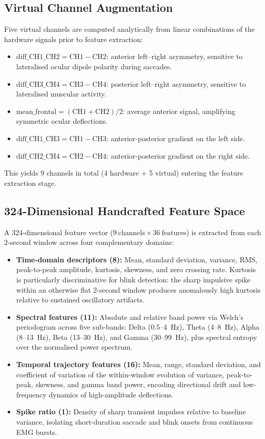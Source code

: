 \documentclass[11pt,a4paper]{article}
\begin{document}
\subsection{Virtual Channel Augmentation}
Five virtual channels are computed analytically from linear combinations of the hardware signals prior to feature extraction:
\begin{itemize}
    \item $\text{diff\_CH1\_CH2} = \text{CH1} - \text{CH2}$: anterior left--right asymmetry, sensitive to lateralised ocular dipole polarity during saccades.
    \item $\text{diff\_CH3\_CH4} = \text{CH3} - \text{CH4}$: posterior left--right asymmetry, sensitive to lateralised muscular activity.
    \item $\text{mean\_frontal} = (\text{CH1} + \text{CH2}) / 2$: average anterior signal, amplifying symmetric ocular deflections.
    \item $\text{diff\_CH1\_CH3} = \text{CH1} - \text{CH3}$: anterior-posterior gradient on the left side.
    \item $\text{diff\_CH2\_CH4} = \text{CH2} - \text{CH4}$: anterior-posterior gradient on the right side.
\end{itemize}
This yields 9 channels in total (4 hardware + 5 virtual) entering the feature extraction stage.

\subsection{324-Dimensional Handcrafted Feature Space}
A 324-dimensional feature vector ($9~\text{channels} \times 36~\text{features}$) is extracted from each 2-second window across four complementary domains:
\begin{itemize}
    \item \textbf{Time-domain descriptors (8):} Mean, standard deviation, variance, RMS, peak-to-peak amplitude, kurtosis, skewness, and zero crossing rate. Kurtosis is particularly discriminative for blink detection: the sharp impulsive spike within an otherwise flat 2-second window produces anomalously high kurtosis relative to sustained oscillatory artifacts.

    \item \textbf{Spectral features (11):} Absolute and relative band power via Welch's periodogram across five sub-bands: Delta (0.5--4~Hz), Theta (4--8~Hz), Alpha (8--13~Hz), Beta (13--30~Hz), and Gamma (30--99~Hz), plus spectral entropy over the normalised power spectrum.

    \item \textbf{Temporal trajectory features (16):} Mean, range, standard deviation, and coefficient of variation of the within-window evolution of variance, peak-to-peak, skewness, and gamma band power, encoding directional drift and low-frequency dynamics of high-amplitude deflections.

    \item \textbf{Spike ratio (1):} Density of sharp transient impulses relative to baseline variance, isolating short-duration saccade and blink onsets from continuous EMG bursts.
\end{itemize}
\end{document}
